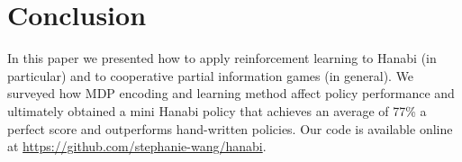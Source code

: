 \section{Conclusion}\label{sec:conclusion}
In this paper we presented how to apply reinforcement learning to Hanabi (in
particular) and to cooperative partial information games (in general). We
surveyed how MDP encoding and learning method affect policy performance and
ultimately obtained a mini Hanabi policy that achieves an average of 77\% a
perfect score and outperforms hand-written policies. Our code is available
online at \url{https://github.com/stephanie-wang/hanabi}.
